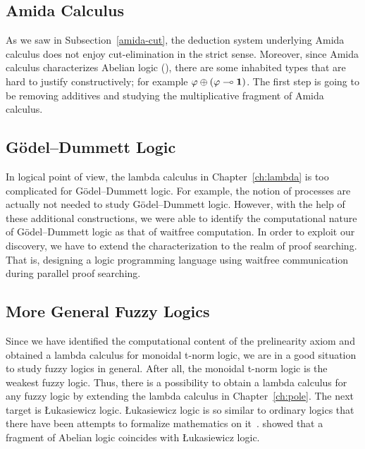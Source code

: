\subsection{Amida Calculus}

As we saw in Subsection~\ref{amida-cut},
the deduction system underlying Amida calculus does not enjoy
cut-elimination in the strict sense.
Moreover, since Amida calculus characterizes Abelian logic
(),
there are some inhabited types that are hard to justify constructively;
for example $\varphi\oplus(\varphi\multimap\mathbf{1})$.
The first step is going to be removing additives and studying the
multiplicative fragment of Amida calculus.

\subsection{G\"odel--Dummett Logic}

In logical point of view, the lambda calculus in Chapter~\ref{ch:lambda}
is too complicated for G\"odel--Dummett logic.
For example, the notion of processes are actually not needed to study
G\"odel--Dummett logic.  However, with the help of these additional
constructions,
we were able to identify the computational nature of G\"odel--Dummett
logic as that of waitfree computation.
In order to exploit our discovery, we have to extend the
characterization to the realm of proof searching.  That is, designing a
logic programming language using waitfree communication during parallel
proof searching.

\subsection{More General Fuzzy Logics}

Since we have identified the computational content of the prelinearity
axiom and obtained a lambda calculus for monoidal t-norm logic, we are
in a good situation to study fuzzy logics in general.
After all, the monoidal t-norm logic is the weakest fuzzy logic.
Thus, there is a possibility to obtain a lambda calculus for any fuzzy
logic by extending the lambda calculus in Chapter~\ref{ch:pole}.
The next target is \L{}ukasiewicz logic.  \L{}ukasiewicz logic is so
similar to ordinary logics that there have been attempts to formalize
mathematics on
it~\citep{Hajek:TheJournalOfSymbolicLogic:2000,hajek2005,yatabe2009}.
\citet[Theorem~9]{metcalfe2002} showed that a fragment of Abelian logic
coincides with \L{}ukasiewicz logic.

